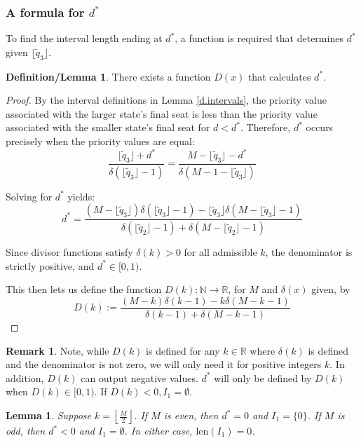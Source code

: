 \documentclass[11pt]{article}
\newtheorem{lemma}[theorem]{Lemma}
\theoremstyle{definition}
\newtheorem{deflem}[theorem]{Definition/Lemma}
\newtheorem{remark}[theorem]{Remark}
\theoremstyle{definition}
\begin{document}
\subsubsection{A formula for $d^*$}
To find the interval length ending at $d^*$, a function is required that determines $d^*$ given $\lfloor \tilde q_3 \rfloor$.
\begin{deflem}\label{d.star} There exists a function $D(x)$ that calculates $d^*$. \end{deflem}
\begin{proof}
By the interval definitions in Lemma \ref{d.intervals}, the priority value associated with the larger state's final seat is less than the priority value associated with the smaller state's final seat for $d < d^*$. Therefore, $d^*$ occurs precisely when the priority values are equal:
$$ \frac{\lfloor \tilde{q}_3 \rfloor +d^*}{\delta(\lfloor \tilde{q}_3 \rfloor -1)} = \frac{M-\lfloor \tilde{q}_3 \rfloor-d^*}{\delta(M-1-\lfloor \tilde{q}_3 \rfloor)}$$


Solving for $d^*$ yields:
$$ d^* = \frac{(M-\lfloor \tilde{q}_3 \rfloor)\delta(\lfloor \tilde{q}_3 \rfloor-1) - \lfloor \tilde{q}_3 \rfloor \delta(M-\lfloor \tilde{q}_3 \rfloor-1)}{\delta(\lfloor \tilde{q}_2 \rfloor-1) +\delta(M-\lfloor \tilde{q}_2 \rfloor-1)} $$

Since divisor functions satisfy $\delta(k) > 0$ for all admissible $k$, the denominator is strictly positive, and $d^* \in [0,1)$.

This then lets us define the function $D(k): \mathbb{N} \to \mathbb{R}$, for $M$ and $\delta(x)$ given, by 
$$D(k) := \frac{(M-k)\delta(k-1) - k \delta(M-k-1)}{\delta(k-1) +\delta(M-k-1)}$$
\end{proof}

\begin{remark}
Note, while $D(k)$ is defined for any $k \in \mathbb{R}$ where $\delta(k)$ is defined and the denominator is not zero, we will only need it for positive integers $k$. In addition, $D(k)$ can output negative values. $d^*$ will only be defined by $D(k)$ when $D(k)\in [0,1).$ If $D(k) <0, I_1 = \emptyset.$
\end{remark}

\begin{lemma}\label{I1.zero}
Suppose $k = \left\lfloor \frac{M}{2} \right\rfloor$.
If $M$ is even, then $d^*=0$ and $I_1=\{0\}$.
If $M$ is odd, then $d^*<0$ and $I_1=\emptyset$.
In either case, $\mathrm{len}(I_1)=0$.
\end{lemma}
\end{document}

